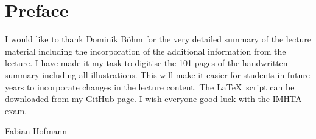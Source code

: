 \section{Preface}
I would like to thank Dominik Böhm for the very detailed summary of the lecture material including the incorporation of the additional information from the lecture.
I have made it my task to digitise the 101 pages of the handwritten summary including all illustrations.
This will make it easier for students in future years to incorporate changes in the lecture content.
The \LaTeX~script can be downloaded from my GitHub page.
I wish everyone good luck with the IMHTA exam.

\vspace{0.5cm}

Fabian Hofmann


\printbibliography

%


